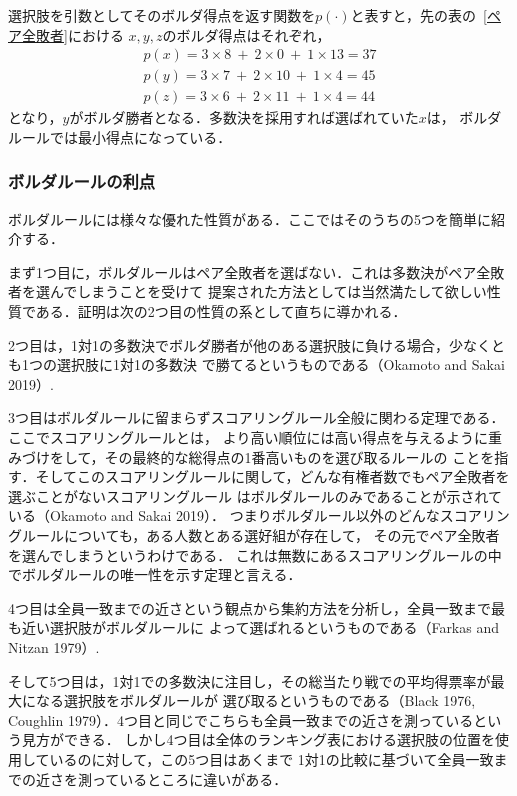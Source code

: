 \documentclass[dvipdfmx]{jsarticle}
\begin{document}
選択肢を引数としてそのボルダ得点を返す関数を$p(\cdot)$と表すと，先の表の~\ref{ペア全敗者}における
$x,y,z$のボルダ得点はそれぞれ，
\begin{align*}
  p(x) = 3 \times 8 \ + \ 2 \times 0 \ + \ 1 \times 13 = 37 \\
  p(y) = 3 \times 7 \ + \ 2 \times 10 \ + \ 1 \times 4 = 45 \\
  p(z) = 3 \times 6 \ + \ 2 \times 11 \ + \ 1 \times 4 = 44
\end{align*}
となり，$y$がボルダ勝者となる．多数決を採用すれば選ばれていた$x$は，
ボルダルールでは最小得点になっている．

\subsubsection{ボルダルールの利点}\label{ボルダルールの利点}
ボルダルールには様々な優れた性質がある．ここではそのうちの5つを簡単に紹介する．

まず1つ目に，ボルダルールはペア全敗者を選ばない．これは多数決がペア全敗者を選んでしまうことを受けて
提案された方法としては当然満たして欲しい性質である．証明は次の2つ目の性質の系として直ちに導かれる．

2つ目は，1対1の多数決でボルダ勝者が他のある選択肢に負ける場合，少なくとも1つの選択肢に1対1の多数決
で勝てるというものである（Okamoto and Sakai 2019）.

3つ目はボルダルールに留まらずスコアリングルール全般に関わる定理である．ここでスコアリングルールとは，
より高い順位には高い得点を与えるように重みづけをして，その最終的な総得点の1番高いものを選び取るルールの
ことを指す．そしてこのスコアリングルールに関して，どんな有権者数でもペア全敗者を選ぶことがないスコアリングルール
はボルダルールのみであることが示されている（Okamoto and Sakai 2019）．
つまりボルダルール以外のどんなスコアリングルールについても，ある人数とある選好組が存在して，
その元でペア全敗者を選んでしまうというわけである．
これは無数にあるスコアリングルールの中でボルダルールの唯一性を示す定理と言える．

4つ目は全員一致までの近さという観点から集約方法を分析し，全員一致まで最も近い選択肢がボルダルールに
よって選ばれるというものである（Farkas and Nitzan 1979）.

そして5つ目は，1対1での多数決に注目し，その総当たり戦での平均得票率が最大になる選択肢をボルダルールが
選び取るというものである（Black 1976, Coughlin 1979）．4つ目と同じでこちらも全員一致までの近さを測っているという見方ができる．
しかし4つ目は全体のランキング表における選択肢の位置を使用しているのに対して，この5つ目はあくまで
1対1の比較に基づいて全員一致までの近さを測っているところに違いがある．
\end{document}
